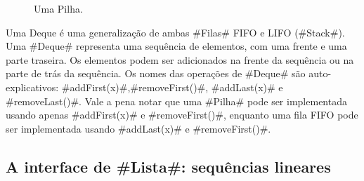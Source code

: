 \begin{figure}
	\caption[Uma pilha]{Uma Pilha.}
\end{figure}

Uma Deque
%
é uma generalização de ambas #Filas# FIFO e LIFO (#Stack#). Uma #Deque#
representa uma sequência de elementos, com uma frente e uma parte traseira. Os
elementos podem ser adicionados na frente da sequência ou na parte de trás da
sequência. Os nomes das operações de #Deque# são auto-explicativos:
#addFirst(x)#,#removeFirst()#, #addLast(x)# e #removeLast()#. Vale a pena notar
que uma #Pilha# pode ser implementada usando 
apenas #addFirst(x)# e #removeFirst()#, enquanto uma fila FIFO pode ser
implementada usando #addLast(x)# e #removeFirst()#.

\subsection{A interface de #Lista#: sequências lineares}

